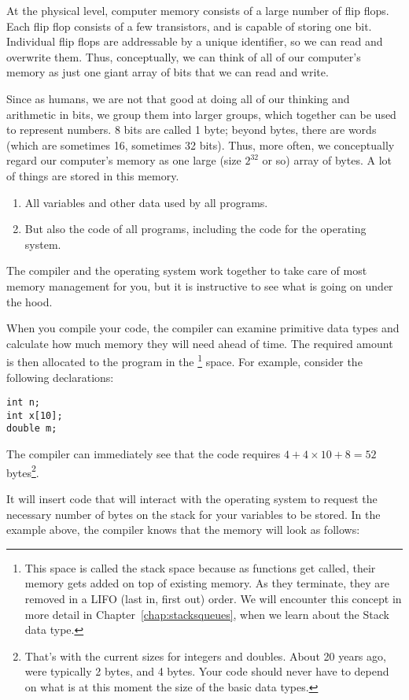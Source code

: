 At the physical level, computer memory consists of a large number of
flip flops.
Each flip flop consists of a few transistors,
and is capable of storing one bit.
Individual flip flops are addressable by a unique identifier,
so we can read and overwrite them. 
Thus, conceptually, we can think of all of our computer's memory as
just one giant array of bits that we can read and write.

Since as humans, we are not that good at doing all of our thinking and
arithmetic in bits, we group them into larger groups,
which together can be used to represent numbers.
8 bits are called 1 byte; beyond bytes, there are words
(which are sometimes 16, sometimes 32 bits).
Thus, more often, we conceptually regard our computer's memory as one
large (size $2^{32}$ or so) array of bytes.
A lot of things are stored in this memory.

\begin{enumerate}
\item All variables and other data used by all programs.
\item But also the code of all programs, including the code for the
  operating system.
\end{enumerate}

The compiler and the operating system work together to take care of
most memory management for you, but it is instructive to see what is
going on under the hood.

When you compile your code, the compiler can examine primitive data
types and calculate how much memory they will need ahead of time.
The required amount is then allocated to the program in the
\footnote{This space is called the stack space because as
  functions get called, their memory gets added on top of existing
  memory. As they terminate, they are removed in a LIFO (last in,
  first out) order. We will encounter this concept in more detail in
  Chapter~\ref{chap:stacksqueues}, when we learn about the Stack data type.}
space. For example, consider the following declarations: 
\begin{verbatim}
int n;
int x[10];
double m;
\end{verbatim}
The compiler can immediately see that the code requires
$4+4\times10+8=52$ bytes\footnote{That's with the current sizes for
  integers and doubles. About 20 years ago,  were typically
  2 bytes, and  4 bytes. Your code should never have to
  depend on what is at this moment the size of the basic data types.}.

It will insert code that will interact with the operating system to
request the necessary number of bytes on the stack for your variables
to be stored. In the example above, the compiler knows that the memory
will look as follows:

